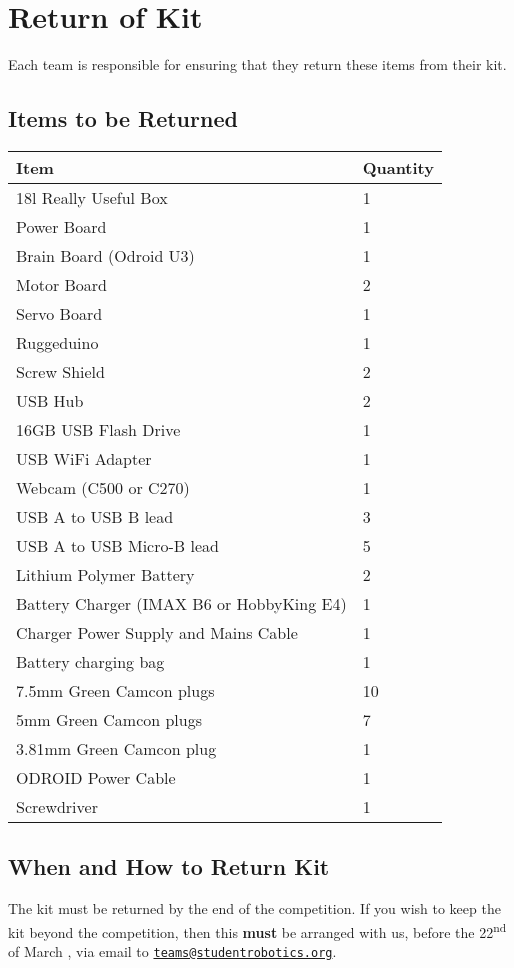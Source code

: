 \section {Return of Kit}
\label{sec:kit-return}

Each team is responsible for ensuring that they return these items from their kit.

\subsection {Items to be Returned}

\begin{tabular}{ll}
 \toprule
 \textbf{Item} & \textbf{Quantity} \\
 \midrule
 18l Really Useful Box & 1 \\

 Power Board & 1 \\
 Brain Board (Odroid U3) & 1 \\
 Motor Board & 2 \\
 Servo Board & 1 \\
 Ruggeduino & 1 \\
 Screw Shield & 2 \\

 USB Hub & 2 \\
 16GB USB Flash Drive & 1 \\
 USB WiFi Adapter & 1 \\
 Webcam (C500 or C270) & 1 \\
 USB A to USB B lead & 3 \\
 USB A to USB Micro-B lead & 5 \\

 Lithium Polymer Battery & 2 \\
 Battery Charger (IMAX B6 or HobbyKing E4) & 1 \\
 Charger Power Supply and Mains Cable & 1 \\
 Battery charging bag & 1 \\

 7.5mm Green Camcon plugs & 10 \\
 5mm Green Camcon plugs & 7 \\
 3.81mm Green Camcon plug & 1 \\
 ODROID Power Cable & 1 \\
 Screwdriver & 1 \\
 \bottomrule
\end{tabular}

\subsection {When and How to Return Kit}

The kit must be returned by the end of the competition.
If you wish to keep the kit beyond the competition, then this \textbf{must} be arranged with us,
 before the 22\textsuperscript{nd} of March \sryear, via email to \href{mailto:teams@studentrobotics.org}{\nolinkurl{teams@studentrobotics.org}}.
